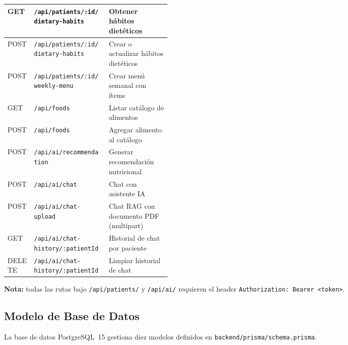 \documentclass[12pt,a4paper]{article}
\begin{document}
\begin{longtable}{|l|l|p{0.38\linewidth}|}
\hline
GET    & \texttt{/api/patients/:id/dietary-habits}   & Obtener hábitos dietéticos \\
\hline
POST   & \texttt{/api/patients/:id/dietary-habits}   & Crear o actualizar hábitos dietéticos \\
\hline
POST   & \texttt{/api/patients/:id/weekly-menu}      & Crear menú semanal con ítems \\
\hline
GET    & \texttt{/api/foods}                         & Listar catálogo de alimentos \\
\hline
POST   & \texttt{/api/foods}                         & Agregar alimento al catálogo \\
\hline
POST   & \texttt{/api/ai/recommendation}             & Generar recomendación nutricional \\
\hline
POST   & \texttt{/api/ai/chat}                       & Chat con asistente IA \\
\hline
POST   & \texttt{/api/ai/chat-upload}                & Chat RAG con documento PDF (multipart) \\
\hline
GET    & \texttt{/api/ai/chat-history/:patientId}    & Historial de chat por paciente \\
\hline
DELETE & \texttt{/api/ai/chat-history/:patientId}    & Limpiar historial de chat \\
\hline
\end{longtable}

\noindent\textbf{Nota:} todas las rutas bajo \texttt{/api/patients/} y \texttt{/api/ai/}
requieren el header \texttt{Authorization: Bearer \textless{}token\textgreater{}}.

\subsection{Modelo de Base de Datos}

La base de datos PostgreSQL~15 gestiona diez modelos definidos en
\texttt{backend/prisma/schema.prisma}.
\end{document}
